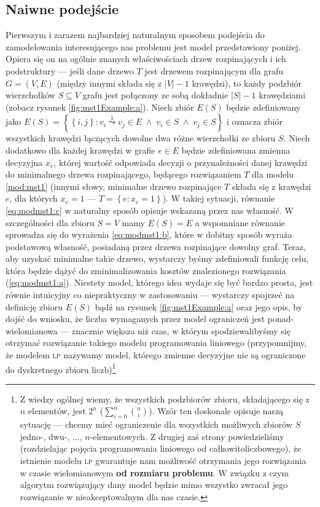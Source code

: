 \subsection{Naiwne podejście}

Pierwszym i zarazem najbardziej naturalnym sposobem podejścia do zamodelowania interesującego nas problemu jest model przedstawiony poniżej. Opiera się on na ogólnie znanych właściwościach drzew rozpinających i ich podstruktury --- jeśli dane drzewo $T$ jest drzewem rozpinającym dla grafu $G = \left( V, E \right)$ (między innymi składa się z $\left| V \right| - 1$ krawędzi), to każdy podzbiór wierzchołków $S \subseteq V$ grafu jest połączony ze sobą dokładnie $\left| S \right| - 1$ krawędziami (zobacz rysunek \ref{fig:mst1Example:a}). Niech zbiór $E \left( S \right)$ będzie zdefiniowany jako $E \left( S \right) = \left\{ \left\{ i, j \right\} : v_{i} \overset{1}\leadsto v_{j} \in E \; \wedge \; v_{i} \in S \; \wedge \; v_{j} \in S \right\}$ i oznacza zbiór wszystkich krawędzi łączących dowolne dwa różne wierzchołki ze zbioru $S$. Niech dodatkowo dla każdej krawędzi w grafie $e \in E$ będzie zdefiniowana zmienna decyzyjna $x_{e}$, której wartość odpowiada decyzji o przynależności danej krawędzi do minimalnego drzewa rozpinającego, będącego rozwiązaniem $T$ dla modelu \ref{mod:mst1} (innymi słowy, minimalne drzewo rozpinające $T$ składa się z krawędzi $e$, dla których $x_{e} = 1$ --- $T = \left\{ e : x_{e} = 1 \right\}$). W takiej sytuacji, równanie \ref{eq:modmst1:c} w naturalny sposób opisuje wskazaną przez nas własność. W szczególności dla zbioru $S = V$ mamy $E \left( S \right) = E$ a wspomniane równanie sprowadza się do wyrażenia \ref{eq:modmst1:b}, które w dobitny sposób wyraża podstawową własność, posiadaną przez drzewa rozpinające dowolny graf. Teraz, aby uzyskać minimalne takie drzewo, wystarczy byśmy zdefiniowali funkcję celu, która będzie dążyć do zminimalizowania kosztów znalezionego rozwiązania (\ref{eq:modmst1:a}). Niestety model, którego idea wydaje się być bardzo prosta, jest równie intuicyjny co niepraktyczny w zastosowaniu --- wystarczy spojrzeć na definicję zbioru $E \left( S \right)$ bądź na rysunek \ref{fig:mst1Example:a} oraz jego opis, by dojść do wniosku, że liczba wymaganych przez model ograniczeń jest ponad-wielomianowa --- znacznie większa niż czas, w którym spodziewalibyśmy się otrzymać rozwiązanie takiego modelu programowania liniowego (przypomnijmy, że modelem \textsc{lp} nazywamy model, którego zmienne decyzyjne nie są ograniczone do dyskretnego zbioru liczb)\footnote{Z wiedzy ogólnej wiemy, że wszystkich podzbiorów zbioru, składającego się z $n$ elementów, jest $2^{n}$ ($\sum_{i=0}^{n} \binom{n}{i}$). Wzór ten doskonale opisuje naszą sytuację --- chcemy mieć ograniczenie dla wszystkich możliwych zbiorów $S$ jedno-, dwu-, $\dots$, $n$-elementowych. Z drugiej zaś strony powiedzieliśmy (rozdzielając pojęcia programowania liniowego od całkowitoliczbowego), że istnienie modelu \textsc{lp} gwarantuje nam możliwość otrzymania jego rozwiązania w czasie wielomianowym \textbf{od rozmiaru problemu}. W związku z czym algorytm rozwiązujący dany model będzie mimo wszystko zwracał jego rozwiązanie w nieakceptowalnym dla nas czasie.}

